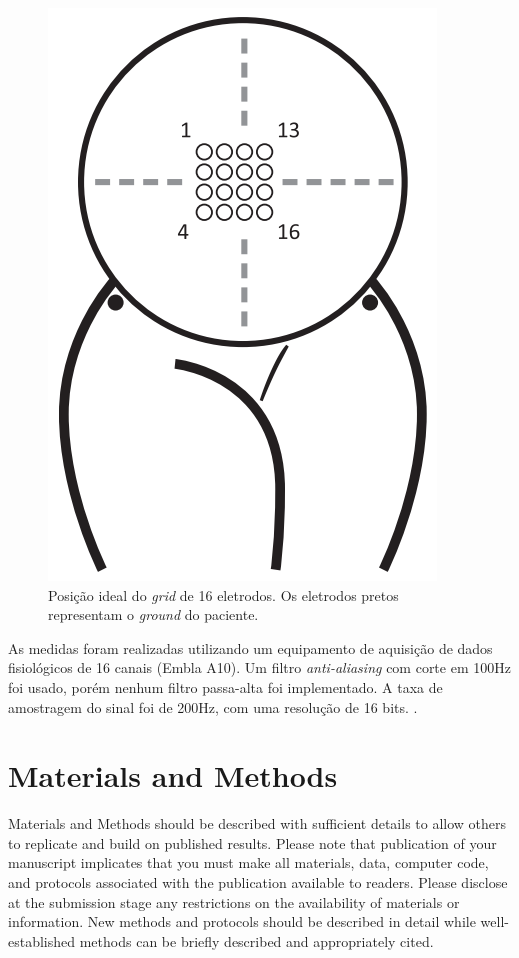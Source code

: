 \documentclass[bioengineering,article,submit,moreauthors,pdftex,10pt,a4paper]{mdpi}
\begin{document}
 \begin{figure}[H]
 	\caption{\label{abd_elec} Posição ideal do {\em grid} de 16 eletrodos. Os eletrodos pretos representam o {\em ground} do paciente.}
 	\begin{center}
 		\includegraphics[scale=0.40]{imagens/abd_elec.png} 		
 	\end{center}
 \end{figure}

As medidas foram realizadas utilizando um equipamento de aquisição de dados fisiológicos de 16 canais (Embla A10). Um filtro {\em anti-aliasing} com corte em 100Hz foi usado, porém nenhum filtro passa-alta foi implementado. A taxa de amostragem do sinal foi de 200Hz, com uma resolução de 16 bits.  \cite{ref-islddatabase}.



 

\section{Materials and Methods}

Materials and Methods should be described with sufficient details to allow others to replicate and build on published results. Please note that publication of your manuscript implicates that you must make all materials, data, computer code, and protocols associated with the publication available to readers. Please disclose at the submission stage any restrictions on the availability of materials or information. New methods and protocols should be described in detail while well-established methods can be briefly described and appropriately cited.
\end{document}
